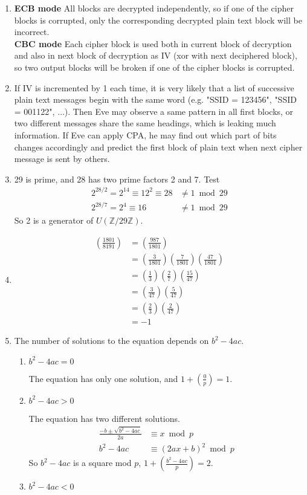 \documentclass[12pt]{article}
\begin{document}
	\begin{enumerate}
		\item
			\textbf{ECB mode}
				All blocks are decrypted independently, so if one of the cipher blocks is corrupted, only the corresponding decrypted plain text block will be incorrect.
			\\
			\textbf{CBC mode}
				Each cipher block is used both in current block of decryption and also in next block of decryption as IV (xor with next deciphered block), so two output blocks will be broken if one of the cipher blocks is corrupted.
		\item
			If IV is incremented by 1 each time, it is very likely that a list of successive plain text messages begin with the same word (e.g. "SSID = 123456", "SSID = 001122", $\ldots$). Then Eve may observe a same pattern in all first blocks, or two different messages share the same headings, which is leaking much information. If Eve can apply CPA, he may find out which part of bits changes accordingly and predict the first block of plain text when next cipher message is sent by others.
		\item
			29 is prime, and 28 has two prime factors 2 and 7. Test
			\begin{align*}
				2^{28/2}=2^{14}\equiv12^2\equiv28&\neq1\bmod 29\\
				2^{28/7}=2^{4}\equiv16&\neq1\bmod 29
			\end{align*}
			So 2 is a generator of $U(\mathbb{Z}/29\mathbb{Z})$.
		\item
			\begin{align*}
				(\frac{1801}{8191})&=(\frac{987}{1801})\\
				&=(\frac{3}{1801})(\frac{7}{1801})(\frac{47}{1801})\\
				&=(\frac{1}{3})(\frac{2}{7})(\frac{15}{47})\\
				&=(\frac{3}{47})(\frac{5}{47})\\
				&=(\frac{2}{3})(\frac{2}{47})\\
				&=-1
			\end{align*}
		\item
			The number of solutions to the equation depends on $b^2-4ac$.
			\begin{enumerate}
				\item
					$b^2-4ac=0$

					The equation has only one solution, and $1+(\frac{0}{p})=1$.
				\item
					$b^2-4ac>0$

					The equation has two different solutions.
					\begin{align*}
						\frac{-b\pm\sqrt{b^2-4ac}}{2a}&\equiv x \bmod p\\
						b^2-4ac&\equiv (2ax+b)^2 \bmod p
					\end{align*}
					So $b^2-4ac$ is a square mod $p$, $1+(\frac{b^2-4ac}{p})=2$.
				\item
					$b^2-4ac<0$


\end{enumerate}
\end{enumerate}
\end{document}

